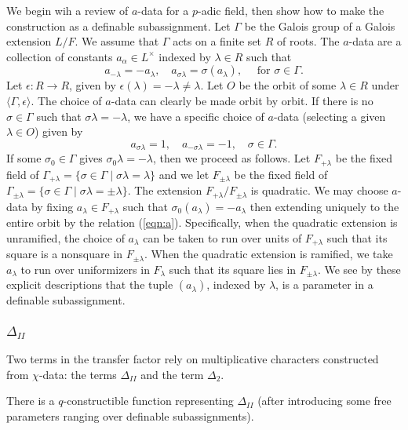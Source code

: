 We begin wih a review of $a$-data for a $p$-adic field, then show how
to make the construction as a definable subassignment.  Let $\Gamma$
be the Galois group of a Galois extension $L/F$.  We assume that
$\Gamma$ acts on a finite set $R$ of roots.  The $a$-data are a
collection of constants $a_\alpha\in L^\times$ indexed by $\lambda\in
R$ such that
\begin{equation}\label{eqn:a}
a_{-\lambda} = -a_\lambda,\quad a_{\sigma\lambda} 
= \sigma(a_\lambda),\quad \text{ for } \sigma\in \Gamma.
\end{equation}
Let $\epsilon:R\to R$, given by
$\epsilon(\lambda)=-\lambda\ne\lambda$.  Let $O$ be the orbit of some
$\lambda\in R$ under $\langle\Gamma,\epsilon\rangle$.  The choice of
$a$-data can clearly be made orbit by orbit.  If there is no
$\sigma\in \Gamma$ such that $\sigma\lambda=-\lambda$, we have a
specific choice of $a$-data (selecting a given $\lambda\in O$) given
by
\[
a_{\sigma\lambda}=1,
\quad a_{-\sigma\lambda}=-1,\quad \sigma\in\Gamma.
\]
If some $\sigma_0\in\Gamma$ gives $\sigma_0\lambda=-\lambda$, then we
proceed as follows. Let $F_{+\lambda}$ be the fixed field of
$\Gamma_{+\lambda} = \{\sigma\in\Gamma\mid \sigma\lambda=\lambda\}$
and we let $F_{\pm\lambda}$ be the fixed field of
$\Gamma_{\pm\lambda} = \{\sigma\in\Gamma\mid
\sigma\lambda=\pm\lambda\}$.
The extension $F_{+\lambda}/F_{\pm\lambda}$ is quadratic.  We may
choose $a$-data by fixing $a_\lambda\in F_{+\lambda}$ such that
$\sigma_0(a_\lambda) = -a_\lambda$ then extending uniquely to the
entire orbit by the relation (\ref{eqn:a}).  Specifically, when the
quadratic extension is unramified, the choice of $a_\lambda$ can be
taken to run over units of $F_{+\lambda}$ such that its square is a
nonsquare in $F_{\pm\lambda}$.  When the quadratic extension is
ramified, we take $a_\lambda$ to run over uniformizers in
$F_{\lambda}$ such that its square lies in $F_{\pm\lambda}$.  We see
by these explicit descriptions that the tuple $(a_\lambda)$, indexed
by $\lambda$,  is a parameter in a
definable subassignment.

\subsubsection{$\Delta_{II}$}
Two terms in the transfer factor rely on multiplicative characters
constructed from $\chi$-data: the terms $\Delta_{II}$ and the term
$\Delta_2$.

\begin{lemma}  
  There is a $q$-constructible function representing $\Delta_{II}$
  (after introducing some free parameters ranging over definable
  subassignments).
\end{lemma}

